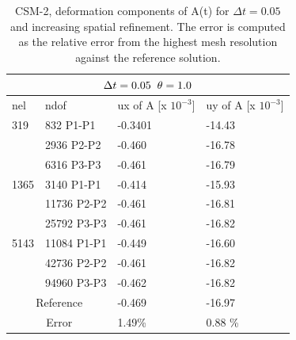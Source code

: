 \begin{table}[h!]
\centering
\begin{tabular}{ |p{1cm}||p{2.7cm}|p{3.3cm}|p{3.3cm}|}
\hline
  \multicolumn{4}{|c|}{$\Delta t = 0.05 \hspace{2mm} \theta = 1.0$} \\
\hline
nel & ndof & ux of A [x $10^{-3}$]  &uy of A [x $10^{-3}$] \\
\hline
 319     & 832 P1-P1  & -0.3401 &  -14.43  \\ 
     & 2936 P2-P2 &  -0.460  &  -16.78  \\ 
      & 6316 P3-P3 & -0.461 &  -16.79  \\
        \hline
  1365    & 3140 P1-P1  &  -0.414 &  -15.93\\
     & 11736 P2-P2 &  -0.461 &  -16.81 \\
     & 25792 P3-P3 & -0.461  &  -16.82 \\
        \hline
   5143    & 11084 P1-P1 & -0.449 &  -16.60  \\
     & 42736 P2-P2 &-0.461 &  -16.82 \\
     & 94960 P3-P3 & -0.462 &  -16.82 \\
  \hline
  \multicolumn{2}{|c|}{Reference}  & -0.469      & -16.97  \\
   \hline
    \multicolumn{2}{|c|}{Error}  & 1.49\%   & 0.88 \%\\
   \hline
\end{tabular}
\caption{CSM-2, deformation components of A(t) for $\Delta t = 0.05$ and increasing spatial refinement. The error is computed as the relative error from the highest mesh resolution against the reference solution.}
\label{table:csm2}
\end{table}
\newpage
